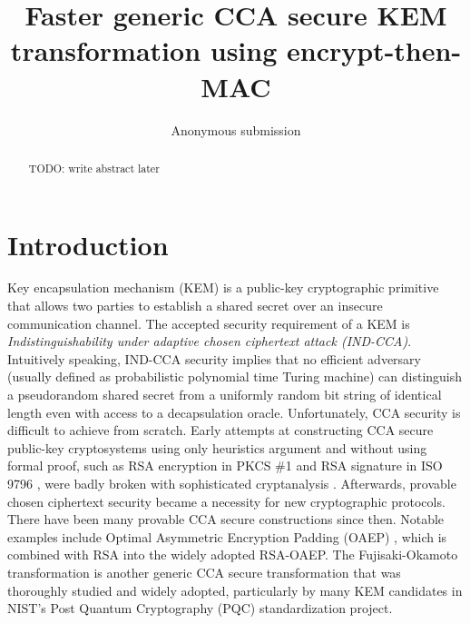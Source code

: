 \documentclass[runningheads]{llncs}
\begin{document}
\title{Faster generic CCA secure KEM transformation using encrypt-then-MAC}

\author{
    Anonymous submission
}

\institute{
}

\maketitle              %
%
\begin{abstract}
    {\color{red} TODO: write abstract later}
\end{abstract}

\section{Introduction}\label{sec:introduction}
Key encapsulation mechanism (KEM) is a public-key cryptographic primitive that allows two parties to establish a shared secret over an insecure communication channel. The accepted security requirement of a KEM is \textit{Indistinguishability under adaptive chosen ciphertext attack (IND-CCA)}. Intuitively speaking, IND-CCA security implies that no efficient adversary (usually defined as probabilistic polynomial time Turing machine) can distinguish a pseudorandom shared secret from a uniformly random bit string of identical length even with access to a decapsulation oracle. Unfortunately, CCA security is difficult to achieve from scratch. Early attempts at constructing CCA secure public-key cryptosystems using only heuristics argument and without using formal proof, such as RSA encryption in PKCS \#1 \cite{DBLP:journals/rfc/rfc2313} and RSA signature in ISO 9796 \cite{ISO9796-1}, were badly broken with sophisticated cryptanalysis \cite{DBLP:conf/crypto/Bleichenbacher98,DBLP:conf/eurocrypt/Grieu00,DBLP:conf/crypto/CoronNS99}. Afterwards, provable chosen ciphertext security became a necessity for new cryptographic protocols. There have been many provable CCA secure constructions since then. Notable examples include Optimal Asymmetric Encryption Padding (OAEP) \cite{DBLP:conf/eurocrypt/BellareR94}, which is combined with RSA \cite{DBLP:conf/crypto/FujisakiOPS01} into the widely adopted RSA-OAEP. The Fujisaki-Okamoto transformation \cite{DBLP:conf/crypto/FujisakiO99,DBLP:conf/tcc/HofheinzHK17} is another generic CCA secure transformation that was thoroughly studied and widely adopted, particularly by many KEM candidates in NIST's Post Quantum Cryptography (PQC) standardization project.
\end{document}

